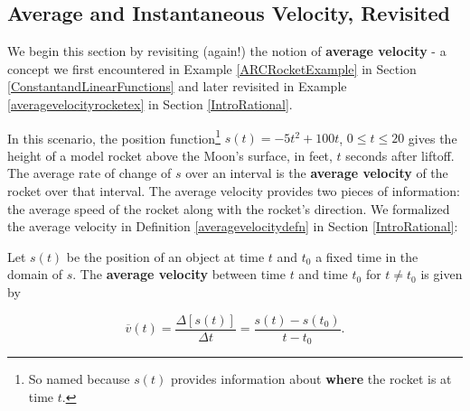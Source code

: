 \documentclass{ximera}
\begin{document}
	\author{Stitz-Zeager}




\setcounter{footnote}{0}

\label{IntroductiontoDerivatives}

\subsection{Average and Instantaneous Velocity, Revisited}
\label{avginstantvelocity}

We begin this section by revisiting (again!) the notion of \textbf{average velocity} - a concept we first encountered in  Example \ref{ARCRocketExample} in Section \ref{ConstantandLinearFunctions} and later revisited in Example \ref{averagevelocityrocketex} in Section \ref{IntroRational}. 


\medskip

In this scenario,  the position  function\footnote{So named because $s(t)$   provides information about \textbf{where} the rocket is at time $t$.} $s(t) = -5t^2+100t$, $0 \leq t \leq 20$ gives the height of a model rocket above the Moon's surface, in feet,  $t$ seconds after liftoff.  The average rate of change of $s$ over an interval is the \textbf{average velocity} of the rocket over that interval.  The average velocity provides two pieces of information:  the average speed of the rocket along with the rocket's direction.   We formalized the average velocity in Definition \ref{averagevelocitydefn} in Section \ref{IntroRational}:

\medskip

\colorbox{ResultColor}{\bbm

\begin{defnrecall} Let $s(t)$ be the position of an object at time $t$ and $t_{0}$  a fixed time in the domain of $s$.  The \textbf{average velocity} between time $t$ and time $t_{0}$  for $t \neq t_{0}$ is given by

\[ \overline{v}(t) = \dfrac{\Delta [s(t)]}{\Delta t} = \dfrac{s(t) - s(t_{0})}{t - t_{0}}. \]


\end{defnrecall}

\ebm}

\medskip
\end{document}
